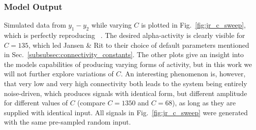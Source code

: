 \subsubsection{Model Output}
Simulated data from $y_1-y_2$ while varying $C$ is plotted in Fig.~\ref{fig:jr_c_sweep},
which is perfectly reproducing ~\cite[Fig. 3]{jansen_electroencephalogram_1995}.
The desired alpha-activity is clearly visible for $C = 135$,
which led Jansen \& Rit to their choice of default parameters mentioned in Sec.~\ref{subsubsec:connectivity_constants}.
The other plots give an insight into the models capabilities of producing varying forms of activity,
but in this work we will not further explore variations of $C$.
An interesting phenomenon is, however,
that very low and very high connectivity both leads to the system being entirely noise-driven,
which produces signals with identical form, but different amplitude for different values of $C$ (compare $C=1350$ and $C=68$),
as long as they are supplied with identical input.
All signals in Fig.~\ref{fig:jr_c_sweep} were generated with the same pre-sampled random input.

